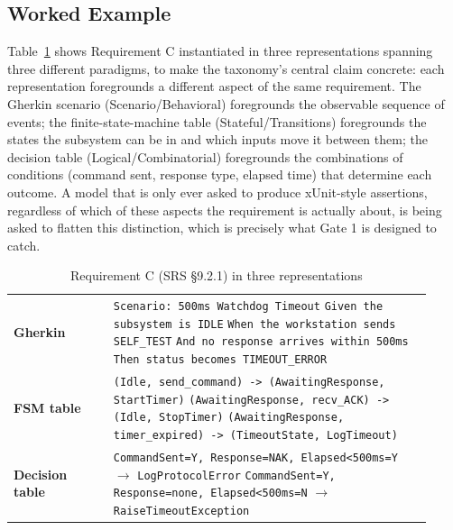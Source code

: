 \documentclass[conference]{IEEEtran}
\begin{document}
\subsection{Worked Example}
\label{sec:worked}
Table~\ref{tab:worked} shows Requirement C instantiated in three
representations spanning three different paradigms, to make the taxonomy's
central claim concrete: each representation foregrounds a different aspect of
the same requirement. The Gherkin scenario (Scenario/Behavioral) foregrounds
the observable sequence of events; the finite-state-machine table
(Stateful/Transitions) foregrounds the states the subsystem can be in and
which inputs move it between them; the decision table (Logical/Combinatorial)
foregrounds the combinations of conditions (command sent, response type,
elapsed time) that determine each outcome. A model that is only ever asked to
produce xUnit-style assertions, regardless of which of these aspects the
requirement is actually about, is being asked to flatten this distinction,
which is precisely what Gate 1 is designed to catch.

\begin{table}[t]
\centering
\caption{Requirement C (SRS \S9.2.1) in three representations}
\label{tab:worked}
\scriptsize
\begin{tabular}{@{}p{0.22\linewidth}p{0.70\linewidth}@{}}
\toprule
\textbf{Gherkin} & \texttt{Scenario: 500ms Watchdog Timeout}\newline
\texttt{Given the subsystem is IDLE}\newline
\texttt{When the workstation sends SELF\_TEST}\newline
\texttt{And no response arrives within 500ms}\newline
\texttt{Then status becomes TIMEOUT\_ERROR} \\
\addlinespace
\textbf{FSM table} &
\texttt{(Idle, send\_command) -> (AwaitingResponse, StartTimer)}\newline
\texttt{(AwaitingResponse, recv\_ACK) -> (Idle, StopTimer)}\newline
\texttt{(AwaitingResponse, timer\_expired) -> (TimeoutState, LogTimeout)} \\
\addlinespace
\textbf{Decision table} &
\texttt{CommandSent=Y, Response=NAK, Elapsed<500ms=Y} $\rightarrow$ \texttt{LogProtocolError}\newline
\texttt{CommandSent=Y, Response=none, Elapsed<500ms=N} $\rightarrow$ \texttt{RaiseTimeoutException} \\
\bottomrule
\end{tabular}
\end{table}
\end{document}
